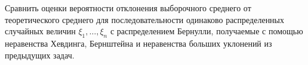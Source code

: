 \begin{problem}
Сравнить оценки вероятности отклонения выборочного среднего от теоретического среднего для последовательности одинаково распределенных случайных величин $\xi_1,\dots,\xi_n$ с распределением Бернулли, получаемые с помощью неравенства Хевдинга, Бернштейна и неравенства больших уклонений из предыдущих задач.
\end{problem}
\medskip 


